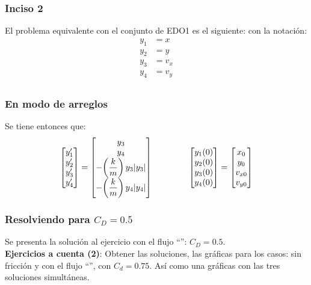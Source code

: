 \documentclass[12pt]{beamer}
\begin{document}
\begin{frame}
\frametitle{Inciso 2}
El problema equivalente con el conjunto de EDO1 es el siguiente: \pause con la notación:
\pause
\begin{align*}
y_{1} &= x \\
y_{2} &= y \\
y_{3} &= v_{x} \\
y_{4} &= v_{y} \\
\end{align*}
\end{frame}
\begin{frame}
\frametitle{En modo de arreglos}
Se tiene entonces que:
\pause
\begin{align*}
\begin{bmatrix}
{y}^{\prime}_{1} \\
{y}^{\prime}_{2} \\
{y}^{\prime}_{3} \\
{y}^{\prime}_{4} 
\end{bmatrix}
= 
\begin{bmatrix}
y_{3} \\
y_{4} \\
- \bigg( \dfrac{k}{m} \bigg) \, y_{3} \abs{y_{3}} \\
- \bigg( \dfrac{k}{m} \bigg) \, y_{4} \abs{y_{4}}
\end{bmatrix}
\hspace{1.5cm}
\begin{bmatrix}
y_{1} (0) \\
y_{2} (0) \\
y_{3} (0) \\
y_{4} (0)
\end{bmatrix}
=
\begin{bmatrix}
x_{0} \\
y_{0} \\
v_{x0} \\
v_{y0}
\end{bmatrix}
\end{align*}
\end{frame}
\begin{frame}
\frametitle{Resolviendo para $C_{D} = 0.5$}
Se presenta la solución al ejercicio con el flujo \enquote{}: $C_{D} = 0.5$.
\\
\bigskip
\pause
\textbf{Ejercicios a cuenta (2)}: Obtener las soluciones, las gráficas para los casos: sin fricción y con el flujo \enquote{}, con $C_{d} = 0.75$. Así como una gráficas con las tres soluciones simultáneas.
\end{frame}
\end{document}
